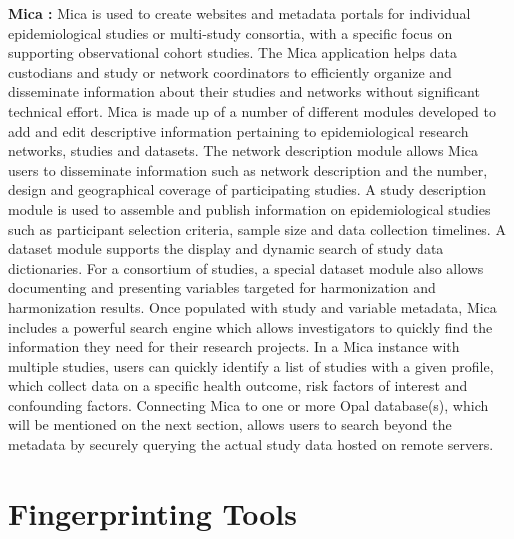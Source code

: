 \textbf{Mica \cite{mica}:}
Mica is used to create websites and metadata portals for individual epidemiological
studies or multi-study consortia, with a specific focus on supporting observational
cohort studies.
The Mica application helps data custodians and study or network coordinators to
efficiently organize and disseminate information about their studies and networks
without significant technical effort.
Mica is made up of a number of different modules developed to add and edit descriptive
information pertaining to epidemiological research networks, studies and datasets.
The network description module allows Mica users to disseminate information such as
network description and the number, design and geographical coverage of participating
studies.
A study description module is used to assemble and publish information on
epidemiological studies such as participant selection criteria, sample size and data
collection timelines.
A dataset module supports the display and dynamic search of study data dictionaries.
For a consortium of studies, a special dataset module also allows documenting and
presenting variables targeted for harmonization and harmonization results.
Once populated with study and variable metadata, Mica includes a powerful search engine
which allows investigators to quickly find the information they need for their research
projects.
In a Mica instance with multiple studies, users can quickly identify a list of studies
with a given profile, which collect data on a specific health outcome, risk factors of
interest and confounding factors.
Connecting Mica to one or more Opal database(s), which will be mentioned on the next
section, allows users to search beyond the metadata by securely querying the actual
study data hosted on remote servers.

%
%
%
%
%
%
%

\section{Fingerprinting Tools}

